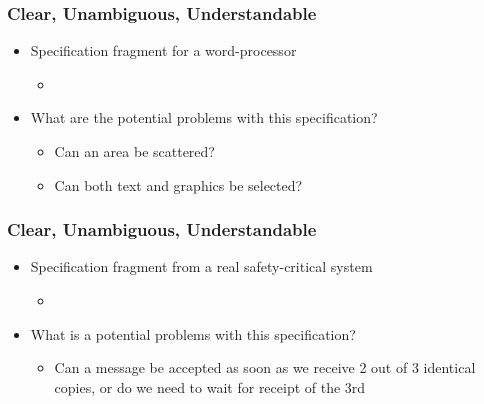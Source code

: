 \documentclass[t,12pt,numbers,fleqn]{beamer}
\begin{document}
\begin{frame}
\frametitle{Clear, Unambiguous, Understandable}

\begin{itemize}

\item Specification fragment for a word-processor
\begin{itemize}
\item {}
\end{itemize}
\item What are the potential problems with this specification?
\begin{itemize}
\item<2-> {\alert{Can an area be scattered?}}
\item<2->{\alert{Can both text and graphics be selected?}}
\end{itemize}
\end{itemize}

\end{frame}


\begin{frame}
\frametitle{Clear, Unambiguous, Understandable}

\begin{itemize}

\item Specification fragment from a real safety-critical system
\begin{itemize}
\item {}
\end{itemize}
\item What is a potential problems with this specification?
\begin{itemize}
\item<2-> {\alert{Can a message be accepted as soon as we receive 2 out of 3 identical copies, or do we need to wait
for receipt of the 3rd}}
\end{itemize}
\end{itemize}

\end{frame}
\end{document}
